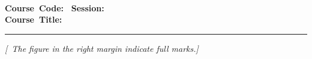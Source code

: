 \begin{center}
	\textbf{\Large{\institutionName{}}}\\[2pt]
	\textbf{\large{\deptName{}}}\\[2pt]
	\textbf{\examName{}}\\[2pt]
	\textbf{Course~Code:~\courseCode{}} \hspace{10mm} \textbf{Session:}~\SessionExaminee\\[2pt]
	\textbf{Course~Title:}~\courseTitle{}\\
	
	
	
\end{center}

\vspace{1mm}
\noindent
{}

\vspace{-2.0mm}
\noindent\rule{\textwidth}{2pt}

\begin{center}
\vspace{-2.0mm}
\textit{[\specialInstruction{}~The figure in the right margin indicate full marks.]}
\end{center}
\vspace{2mm}
